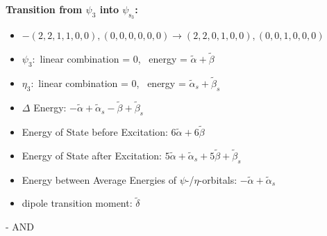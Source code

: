 \documentclass[12pt,a4paper]{article}
\begin{document}
        \noindent\textbf{Transition from $\psi_{3}$ into $\psi_{\text{s}_{3}}$:}
        \begin{itemize}
            \item $- (2, 2, 1, 1, 0, 0), (0, 0, 0, 0, 0, 0) \rightarrow (2, 2, 0, 1, 0, 0), (0, 0, 1, 0, 0, 0)$
        
            \item $\psi_{3}:$ linear combination = $0$, \
            energy = $\tilde{\alpha} + \tilde{\beta}$
            
            \item $\eta_{3}:$ linear combination = $0$, \
            energy = $\tilde{\alpha}_{s} + \tilde{\beta}_{s}$
            
                \item $\Delta$ Energy: $- \tilde{\alpha} + \tilde{\alpha}_{s} - \tilde{\beta} + \tilde{\beta}_{s}$
                \item Energy of State before Excitation: $6 \tilde{\alpha} + 6 \tilde{\beta}$
                \item Energy of State after Excitation: $5 \tilde{\alpha} + \tilde{\alpha}_{s} + 5 \tilde{\beta} + \tilde{\beta}_{s}$
                \item Energy between Average Energies of $\psi$-/$\eta$-orbitals: $- \tilde{\alpha} + \tilde{\alpha}_{s}$
            
            \item dipole transition moment: $\tilde{\delta}$
        
        \end{itemize}
        
 -  AND 
\end{document}
